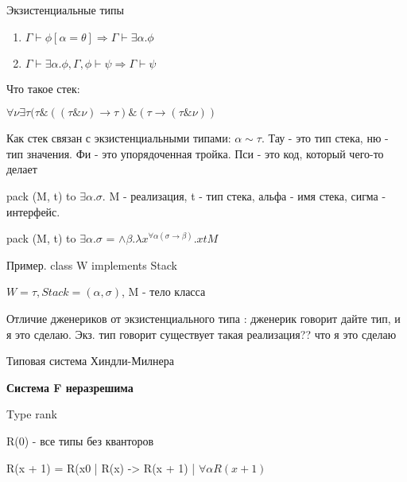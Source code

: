 
\begin{para}{Экзистенциальные типы}

\begin{enumerate}

  \item $\Gamma \vdash \phi [\alpha = \theta] \Rightarrow \Gamma \vdash \exists \alpha . \phi$

  \item $\Gamma \vdash \exists \alpha . \phi, \Gamma, \phi \vdash \psi \Rightarrow \Gamma \vdash \psi$

\end{enumerate}

Что такое стек:

$\forall \nu \exists \tau ( \tau \& ((\tau \& \nu) \rightarrow \tau) \& (\tau \rightarrow (\tau \& \nu))$

Как стек связан с экзистенциальными типами: $\alpha \sim \tau$. Тау - это тип стека, ню - тип значения. Фи - это упорядоченная тройка. Пси - это код, который чего-то делает

pack (M, t) to $\exists \alpha . \sigma$. M - реализация, t - тип стека, альфа - имя стека, сигма - интерфейс.

pack (M, t) to $\exists \alpha . \sigma$ = $\wedge \beta . \lambda x^{\forall \alpha ( \sigma \rightarrow \beta)}. x t M$

Пример. class W implements Stack

$W = \tau, Stack = (\alpha, \sigma)$, M - тело класса

Отличие дженериков от экзистенциального типа : дженерик говорит дайте тип, и я это сделаю. Экз. тип говорит существует такая реализация?? что я это сделаю


\end{para}

\begin{para}{Типовая система Хиндли-Милнера}

\textbf{Система F неразрешима}

\begin{defe}{Type rank}

R(0) - все типы без кванторов

R(x + 1) = R(x0 | R(x) -> R(x + 1) | $\forall \alpha R(x + 1)$

\end{defe}

\end{para}
